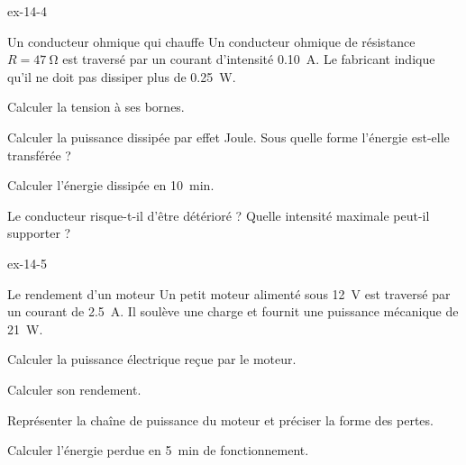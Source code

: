 \begin{blocLivre}{ex-14-4}
\begin{exercice}[1]{Un conducteur ohmique qui chauffe}
Un conducteur ohmique de résistance $R=\qty{47}{\ohm}$ est traversé par un courant d'intensité \qty{0,10}{A}. Le fabricant indique qu'il ne
doit pas dissiper plus de \qty{0,25}{W}.
\begin{questions}
\item Calculer la tension à ses bornes.
\item Calculer la puissance dissipée par effet Joule. Sous quelle forme l'énergie est-elle transférée ?
\item Calculer l'énergie dissipée en \qty{10}{min}.
\item Le conducteur risque-t-il d'être détérioré ? Quelle intensité maximale peut-il supporter ?
\end{questions}
\end{exercice}
\end{blocLivre}
\begin{blocLivre}{ex-14-5}
\begin{exercice}[1]{Le rendement d'un moteur}
Un petit moteur alimenté sous \qty{12}{V} est traversé par un courant de \qty{2,5}{A}. Il soulève une charge et fournit une puissance
mécanique de \qty{21}{W}.
\begin{questions}
\item Calculer la puissance électrique reçue par le moteur.
\item Calculer son rendement.
\item Représenter la chaîne de puissance du moteur et préciser la forme des pertes.
\item Calculer l'énergie perdue en \qty{5}{min} de fonctionnement.
\end{questions}
\end{exercice}
\end{blocLivre}
